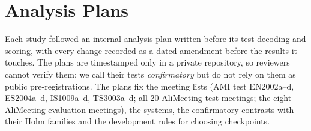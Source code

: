 


\section{Analysis Plans}
\label{app:prereg}

Each study followed an internal analysis plan written before its test decoding and scoring, with every change recorded
as a dated amendment before the results it touches. The plans are timestamped only in a private repository, so
reviewers cannot verify them; we call their tests \emph{confirmatory} but do not rely on them as public
pre-registrations. The plans fix the meeting lists (AMI test EN2002a--d, ES2004a--d, IS1009a--d, TS3003a--d; all 20
AliMeeting test meetings; the eight AliMeeting evaluation meetings), the systems, the confirmatory contrasts with their
Holm families and the development rules for choosing checkpoints.
